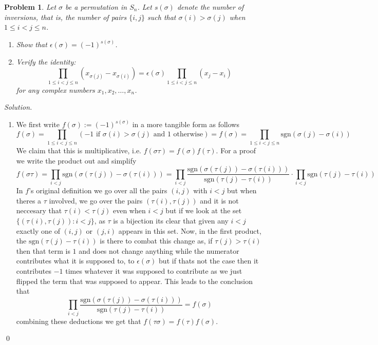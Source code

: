 \documentclass[12pt,a4paper]{article}
\newenvironment{solution}{%
  \par\noindent\textit{Solution.}\ }{\qed}
\theoremstyle{problemstyle}
\newtheorem{problem}{Problem}[section]
\def\sgn{\epsilon}
\begin{document}
\begin{problem}\label{prob:1.3}
    Let $\sigma$ be a permutation in $S_n$. Let $s(\sigma)$ denote the number of inversions, that is, the number of pairs $\{i, j\}$ such that $\sigma(i) > \sigma(j)$ when $1 \le i < j \le n$.
    \begin{enumerate}
        \item Show that $\epsilon(\sigma) = (-1)^{s(\sigma)}$.
        \item Verify the identity:
        \[
            \prod_{1 \le i < j \le n} (x_{\sigma(j)} - x_{\sigma(i)}) = \epsilon(\sigma) \prod_{1 \le i < j \le n} (x_j - x_i)
        \]
        for any complex numbers $x_1, x_2, \dots, x_n$.
    \end{enumerate}
\end{problem}
\begin{solution}
    \begin{enumerate}[label=\arabic*.]
    \item
    We first write $f(\sigma):=(-1)^{s(\sigma)}$ in a more tangible form as follows
    $$f(\sigma)=\prod_{1\leq i<j\leq n}(-1\text{ if }\sigma(i)>\sigma(j)\text{ and }1\text{ otherwise})=f(\sigma)=\prod_{1\leq i<j\leq n}\text{sgn}(\sigma(j)-\sigma(i))$$
    We claim that this is multiplicative, i.e. $f(\sigma\tau)=f(\sigma)f(\tau).$ 
    For a proof we write the product out and simplify
    $$f(\sigma\tau)=\prod_{i<j}\text{sgn}(\sigma(\tau(j))-\sigma(\tau(i)))=\prod_{i<j}\frac{\text{sgn}(\sigma(\tau(j))-\sigma(\tau(i)))}{\text{sgn}(\tau(j)-\tau(i))}\cdot\prod_{i<j}\text{sgn}(\tau(j)-\tau(i))$$
    In $f$'s original definition we go over all the pairs $(i,j)$ with $i<j$ but when theres a $\tau$ involved, we go over the pairs $(\tau(i),\tau(j))$ and it is not neccesary that $\tau(i)<\tau(j)$ even when $i<j$ but if we look at the set $\{(\tau(i),\tau(j)):i<j\}$, as $\tau$ is a bijection its clear that given any $i<j$ exactly one of $(i,j)$ or $(j,i)$ appears in this set. 
    Now, in the first product, the $\text{sgn}(\tau(j)-\tau(i))$ is there to combat this change as, if $\tau(j)>\tau(i)$ then that term is $1$ and does not change anything while the numerator contributes what it is supposed to, to $\sgn(\sigma)$ but if thats not the case then it contributes $-1$ times whatever it was supposed to contribute as we just flipped the term that was supposed to appear. 
    This leads to the conclusion that 
    $$\prod_{i<j}\frac{\text{sgn}(\sigma(\tau(j))-\sigma(\tau(i)))}{\text{sgn}(\tau(j)-\tau(i))}=f(\sigma)$$
    combining these deductions we get that $f(\tau\sigma)=f(\tau)f(\sigma).$ 

\end{enumerate}
\end{solution}
\end{document}
